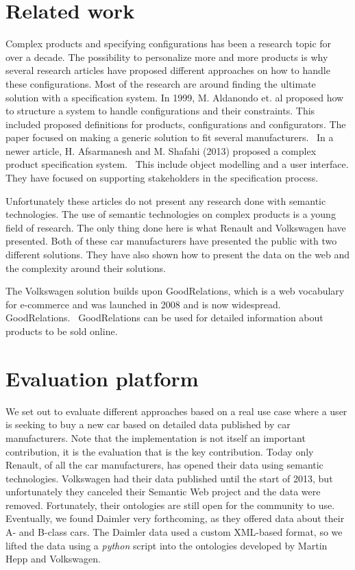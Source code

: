 \documentclass{llncs}
\begin{document}
\section{Related work}
Complex products and specifying configurations has been a research
topic for over a decade.  The possibility to personalize more and more
products is why several research articles have proposed different
approaches on how to handle these configurations. Most of the research
are around finding the ultimate solution with a specification
system. In 1999, M. Aldanondo et. al proposed how to structure a
system to handle configurations and their constraints. This included
proposed definitions for products, configurations and
configurators. The paper focused on making a generic solution to fit
several manufacturers.~\cite{OldConf} In a newer article,
H. Afsarmanesh and M. Shafahi (2013) proposed a complex product
specification system.~\cite{NewConf} This include object modelling and
a user interface. They have focused on supporting stakeholders in the
specification process.

Unfortunately these articles do not present any research done with
semantic technologies. The use of semantic technologies on complex
products is a young field of research. The only thing done here is
what Renault and Volkswagen have presented. Both of these car
manufacturers have presented the public with two different
solutions. They have also shown how to present the data on the web and
the complexity around their solutions.

The Volkswagen solution builds upon GoodRelations, which is a web
vocabulary for e-commerce and was launched in 2008 and is now
widespread. GoodRelations.~\cite{GR} GoodRelations can be used for
detailed information about products to be sold online.


\section{Evaluation platform}

We set out to evaluate different approaches based on a real use case
where a user is seeking to buy a new car based on detailed data
published by car manufacturers. Note that the implementation is not
itself an important contribution, it is the evaluation that is the key
contribution. Today only Renault, of all the car manufacturers, has
opened their data using semantic technologies. Volkswagen had their
data published until the start of 2013, but unfortunately they
canceled their Semantic Web project and the data were removed.
Fortunately, their ontologies are still open for the community to
use. Eventually, we found Daimler very forthcoming, as they offered
data about their A- and B-class cars.  The Daimler data used a custom
XML-based format, so we lifted the data using a \textit{python} script into the
ontologies developed by Martin Hepp and Volkswagen.
\end{document}
